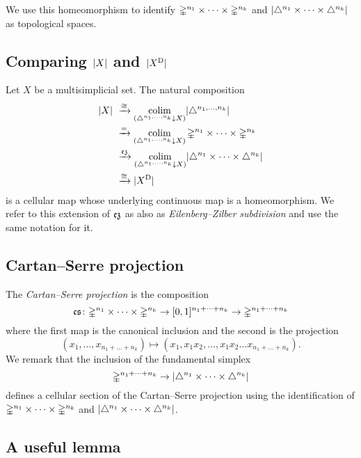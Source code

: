 We use this homeomorphism to identify $\mathbb{\Delta}^{n_1} \times \dots \times \mathbb{\Delta}^{n_k}$ and $\lvert\triangle^{n_1} \times \dots \times \triangle^{n_k}\rvert$ as topological spaces.

\subsection{Comparing $\lvert X\rvert$ and $\lvert X^{\mathrm{D}}\rvert$}

Let $X$ be a multisimplicial set.
The natural composition
\begin{align*}
	\lvert X\rvert \ &\xrightarrow{\cong}
	\operatorname*{colim}_{(\triangle^{n_1, \dots, n_k} \downarrow X)} \lvert\triangle^{n_1, \dots, n_k}\rvert \\ &\xrightarrow{=}
	\operatorname*{colim}_{(\triangle^{n_1, \dots, n_k} \downarrow X)} \mathbb{\Delta}^{n_1} \times \dots \times \mathbb{\Delta}^{n_k} \\ &\xrightarrow{\operatorname{\mathfrak{ez}}}
	\operatorname*{colim}_{(\triangle^{n_1, \dots, n_k} \downarrow X)} \lvert\triangle^{n_1} \times \dots \times \triangle^{n_k}\rvert \\ &\xrightarrow{\cong}
	\lvert X^{\mathrm{D}}\rvert
\end{align*}
is a cellular map whose underlying continuous map is a homeomorphism.
We refer to this extension of $\operatorname{\mathfrak{ez}}$ as also as \textit{Eilenberg--Zilber subdivision} and use the same notation for it.

\subsection{Cartan--Serre projection} \label{ss:cartan-serre map}

The \textit{Cartan--Serre projection} is the composition
\[
\operatorname{\mathfrak{cs}} \colon
\mathbb{\Delta}^{n_1} \times \dots \times \mathbb{\Delta}^{n_k} \to
[0,1]^{n_1 + \dots + n_k} \to
\mathbb{\Delta}^{n_1 + \dots + n_k}
\]
where the first map is the canonical inclusion and the second is the projection
\[
(x_1, \dots, x_{n_1 + \dots + n_k}) \mapsto (x_1, x_1x_2, \dots, x_1x_2 \dots x_{n_1 + \dots + n_k}).
\]
We remark that the inclusion of the fundamental simplex
\[
\mathbb{\Delta}^{n_1 + \dots + n_k} \to \lvert\triangle^{n_1} \times \dots \times \triangle^{n_k}\rvert
\]
defines a cellular section of the Cartan--Serre projection using the identification of $\mathbb{\Delta}^{n_1} \times \dots \times \mathbb{\Delta}^{n_k}$ and $\lvert\triangle^{n_1} \times \dots \times \triangle^{n_k}\rvert$.

\subsection{A useful lemma} \label{ss:useful lemma}

